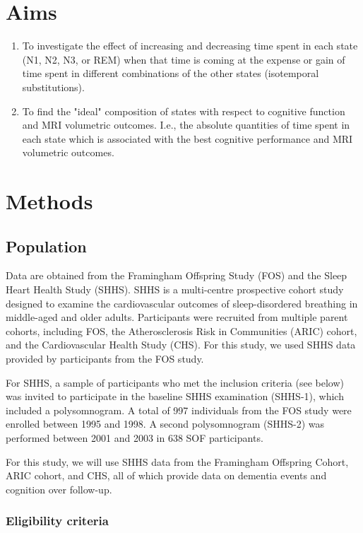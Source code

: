 \documentclass{article}
\begin{document}
\section{Aims}
\begin{enumerate}
    \item To investigate the effect of increasing and decreasing time spent in each state (N1, N2, N3, or REM) when that time is coming at the expense or gain of time spent in different combinations of the other states (isotemporal substitutions).
    \item To find the "ideal" composition of states with respect to cognitive function and MRI volumetric outcomes. I.e., the absolute quantities of time spent in each state which is associated with the best cognitive performance and MRI volumetric outcomes.
\end{enumerate}

\section{Methods}

\subsection{Population}

Data are obtained from the Framingham Offspring Study (FOS) and the Sleep Heart Health Study (SHHS). SHHS is a multi-centre prospective cohort study designed to examine the cardiovascular outcomes of sleep-disordered breathing in middle-aged and older adults. Participants were recruited from multiple parent cohorts, including FOS, the Atherosclerosis Risk in Communities (ARIC) cohort, and the Cardiovascular Health Study (CHS). For this study, we used SHHS data provided by participants from the FOS study.

For SHHS, a sample of participants who met the inclusion criteria (see below) was invited to participate in the baseline SHHS examination (SHHS-1), which included a polysomnogram. A total of 997 individuals from the FOS study were enrolled between 1995 and 1998. A second polysomnogram (SHHS-2) was performed between 2001 and 2003 in 638 SOF participants.

For this study, we will use SHHS data from the Framingham Offspring Cohort, ARIC cohort, and CHS, all of which provide data on dementia events and cognition over follow-up.

\subsubsection{Eligibility criteria}
\end{document}
